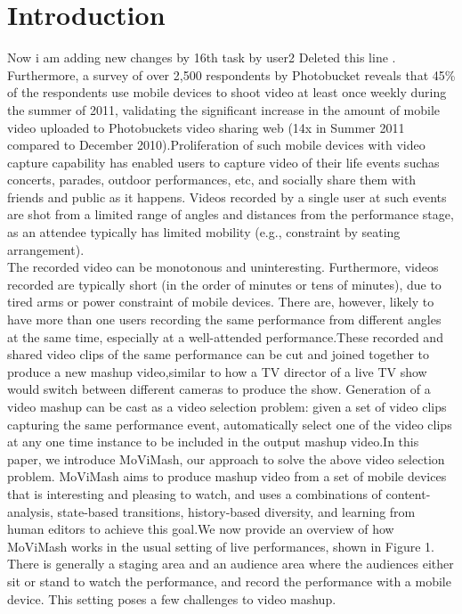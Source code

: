\documentclass{sig-alternate}
\begin{document}
\section{Introduction}
Now i am adding new changes by 16th task by user2 Deleted this line \cite{web:1}. Furthermore, a survey of over 2,500 respondents by Photobucket reveals that 45\% of the \cite{web:2} respondents use mobile devices to shoot video at least once weekly during the summer of 2011, validating the significant increase in the amount of mobile video uploaded to Photobucket\textquotesingle s video sharing web (14x in Summer 2011 compared to December 2010)\cite{web:3}.Proliferation of such mobile devices with video capture capability has enabled users to capture video of their life events suchas concerts, parades, outdoor performances, etc, and socially share them with friends and public as it happens. Videos recorded by a single user at such events are shot from a limited range of angles and distances from the performance stage, as an attendee typically has limited mobility (e.g., constraint by seating arrangement).\\
\qquad  The recorded video can be monotonous and uninteresting. Furthermore, videos recorded are typically short (in the order of minutes or tens of minutes), due to tired arms or power constraint of mobile devices. There are, however, likely to have more than one users
recording the same performance from different angles at the same time, especially at a well-attended performance.These recorded and shared video clips of the same performance
can be cut and joined together to produce a new mashup video,similar to how a TV director of a live TV show would switch between different cameras to produce the show. Generation of a video
mashup can be cast as a video selection problem: given a set of video clips capturing the same performance event, automatically select one of the video clips at any one time instance to be included in the output mashup video.In this paper, we introduce MoViMash, our approach to solve the above video selection problem. MoViMash aims to produce mashup video from a set of mobile devices that is interesting and pleasing to watch, and uses a combinations of content-analysis, state-based transitions, history-based diversity, and learning from
human editors to achieve this goal.We now provide an overview of how MoViMash works in the
usual setting of live performances, shown in Figure 1. There is generally a staging area and an audience area where the audiences either sit or stand to watch the performance, and record the performance with a mobile device. This setting poses a few challenges to video mashup.
\end{document}
